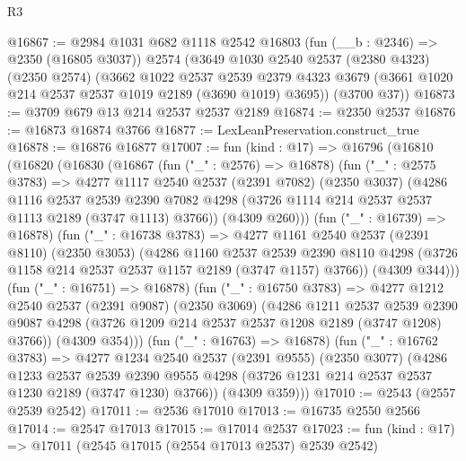 \begin{lexlean}{R3}
\begin{coremodule}
@16867 := @2984
    @1031
    @682
    @1118
    @2542
    @16803
    (fun (__b : @2346) => @2350 (@16805 @3037))
    @2574
    (@3649
      @1030
      @2540
      @2537
      (@2380 @4323)
      (@2350 @2574)
      (@3662
        @1022
        @2537
        @2539
        @2379
        @4323
        @3679
        (@3661 @1020 @214 @2537 @2537 @1019 @2189 (@3690 @1019) @3695))
      (@3700 @37))
@16873 := @3709 @679 @13 @214 @2537 @2537 @2189
@16874 := @2350 @2537
@16876 := @16873 @16874 @3766
@16877 := LexLeanPreservation.construct_true
@16878 := @16876 @16877
@17007 := fun (kind : @17) =>
  @16796
    (@16810
      (@16820
        (@16830
          (@16867
            (fun ("_" : @2576) => @16878)
            (fun ("_" : @2575 @3783) =>
            @4277
              @1117
              @2540
              @2537
              (@2391 @7082)
              (@2350 @3037)
              (@4286
                @1116
                @2537
                @2539
                @2390
                @7082
                @4298
                (@3726 @1114 @214 @2537 @2537 @1113 @2189 (@3747 @1113) @3766))
              (@4309 @260)))
          (fun ("_" : @16739) => @16878)
          (fun ("_" : @16738 @3783) =>
          @4277
            @1161
            @2540
            @2537
            (@2391 @8110)
            (@2350 @3053)
            (@4286
              @1160
              @2537
              @2539
              @2390
              @8110
              @4298
              (@3726 @1158 @214 @2537 @2537 @1157 @2189 (@3747 @1157) @3766))
            (@4309 @344)))
        (fun ("_" : @16751) => @16878)
        (fun ("_" : @16750 @3783) =>
        @4277
          @1212
          @2540
          @2537
          (@2391 @9087)
          (@2350 @3069)
          (@4286
            @1211
            @2537
            @2539
            @2390
            @9087
            @4298
            (@3726 @1209 @214 @2537 @2537 @1208 @2189 (@3747 @1208) @3766))
          (@4309 @354)))
      (fun ("_" : @16763) => @16878)
      (fun ("_" : @16762 @3783) =>
      @4277
        @1234
        @2540
        @2537
        (@2391 @9555)
        (@2350 @3077)
        (@4286
          @1233
          @2537
          @2539
          @2390
          @9555
          @4298
          (@3726 @1231 @214 @2537 @2537 @1230 @2189 (@3747 @1230) @3766))
        (@4309 @359)))
@17010 := @2543 (@2557 @2539 @2542)
@17011 := @2536 @17010
@17013 := @16735 @2550 @2566
@17014 := @2547 @17013
@17015 := @17014 @2537
@17023 := fun (kind : @17) => @17011 (@2545 @17015 (@2554 @17013 @2537) @2539 @2542)

\end{coremodule}
\end{lexlean}
